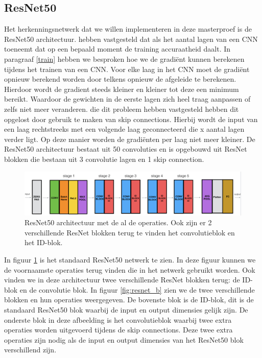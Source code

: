 \subsection{ResNet50} \label{resnet}
Het herkenningsnetwerk dat we willen implementeren in deze masterproef is de ResNet50 architectuur.
\cite{he2015deep} hebben vastgesteld dat als het aantal lagen van een CNN toeneemt dat op een bepaald moment de training accuraatheid daalt.
In paragraaf \ref{train} hebben we besproken hoe we de gradi\"ent kunnen berekenen tijdens het trainen van een CNN.
Voor elke laag in het CNN moet de gradi\"ent opnieuw berekend worden door telkens opnieuw de afgeleide te berekenen.
Hierdoor wordt de gradient steeds kleiner en kleiner tot deze een minimum bereikt.
Waardoor de gewichten in de eerste lagen zich heel traag aanpassen of zelfs niet meer veranderen.
\cite{he2015deep} die dit probleem hebben vastgesteld hebben dit opgelost door gebruik te maken van skip connections.
Hierbij wordt de input van een laag rechtstreeks met een volgende laag geconnecteerd die x aantal lagen verder ligt.
Op deze manier worden de gradi\"enten per laag niet meer kleiner.
De ResNet50 architectuur bestaat uit 50 convoluties en is opgebouwd uit ResNet blokken die bestaan uit 3 convolutie lagen en 1 skip connection.

\begin{figure}[!ht]
	\centering
	\includegraphics[width=1.0\linewidth]{fig/resnet50.png}
	\caption{ResNet50 architectuur met de al de operaties. Ook zijn er 2 verschillende ResNet blokken terug te vinden het convolutieblok en het ID-blok.}
	\label{fig:resnet}
\end{figure}

In figuur \ref{fig:resnet} is het standaard ResNet50 netwerk te zien.
In deze figuur kunnen we de voornaamste operaties terug vinden die in het netwerk gebruikt worden.
Ook vinden we in deze architectuur twee verschillende ResNet blokken terug: de ID-blok en de convolutie blok.
In figuur \ref{fig:resnet_b} zien we de twee verschillende blokken en hun operaties weergegeven.
De bovenste blok is de ID-blok, dit is de standaard ResNet50 blok waarbij de input en output dimensies gelijk zijn.
De onderste blok in deze afbeelding is het convolutieblok waarbij twee extra operaties worden uitgevoerd tijdens de skip connections.
Deze twee extra operaties zijn nodig als de input en output dimensies van het ResNet50 blok verschillend zijn.

